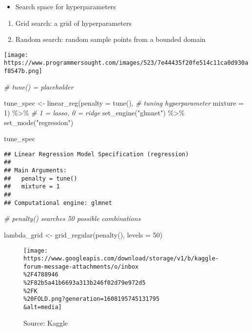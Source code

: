 \documentclass[
]{book}
\newenvironment{Shaded}{\begin{snugshade}}{\end{snugshade}}
\newcommand{\AttributeTok}[1]{\textcolor[rgb]{0.77,0.63,0.00}{#1}}
\newcommand{\CommentTok}[1]{\textcolor[rgb]{0.56,0.35,0.01}{\textit{#1}}}
\newcommand{\DecValTok}[1]{\textcolor[rgb]{0.00,0.00,0.81}{#1}}
\newcommand{\FunctionTok}[1]{\textcolor[rgb]{0.00,0.00,0.00}{#1}}
\newcommand{\NormalTok}[1]{#1}
\newcommand{\OtherTok}[1]{\textcolor[rgb]{0.56,0.35,0.01}{#1}}
\newcommand{\SpecialCharTok}[1]{\textcolor[rgb]{0.00,0.00,0.00}{#1}}
\newcommand{\StringTok}[1]{\textcolor[rgb]{0.31,0.60,0.02}{#1}}
\providecommand{\tightlist}{%
  \setlength{\itemsep}{0pt}\setlength{\parskip}{0pt}}
\begin{document}
\begin{itemize}
\tightlist
\item
  Search space for hyperparameters
\end{itemize}

\begin{enumerate}
\def\labelenumi{\arabic{enumi}.}
\item
  Grid search: a grid of hyperparameters
\item
  Random search: random sample points from a bounded domain
\end{enumerate}

\texttt{[image: https://www.programmersought.com/images/523/7e44435f20fe514c11ca0d930af8547b.png]}

\begin{Shaded}
\begin{Highlighting}[]
\CommentTok{\# tune() = placeholder }

\NormalTok{tune\_spec }\OtherTok{\textless{}{-}} \FunctionTok{linear\_reg}\NormalTok{(}\AttributeTok{penalty =} \FunctionTok{tune}\NormalTok{(), }\CommentTok{\# tuning hyperparameter }
                        \AttributeTok{mixture =} \DecValTok{1}\NormalTok{) }\SpecialCharTok{\%\textgreater{}\%} \CommentTok{\# 1 = lasso, 0 = ridge }
  \FunctionTok{set\_engine}\NormalTok{(}\StringTok{"glmnet"}\NormalTok{) }\SpecialCharTok{\%\textgreater{}\%}
  \FunctionTok{set\_mode}\NormalTok{(}\StringTok{"regression"}\NormalTok{) }

\NormalTok{tune\_spec}
\end{Highlighting}
\end{Shaded}

\begin{verbatim}
## Linear Regression Model Specification (regression)
## 
## Main Arguments:
##   penalty = tune()
##   mixture = 1
## 
## Computational engine: glmnet
\end{verbatim}

\begin{Shaded}
\begin{Highlighting}[]
\CommentTok{\# penalty() searches 50 possible combinations }

\NormalTok{lambda\_grid }\OtherTok{\textless{}{-}} \FunctionTok{grid\_regular}\NormalTok{(}\FunctionTok{penalty}\NormalTok{(), }\AttributeTok{levels =} \DecValTok{50}\NormalTok{)}
\end{Highlighting}
\end{Shaded}

\begin{figure}
\centering
\texttt{[image: https://www.googleapis.com/download/storage/v1/b/kaggle-forum-message-attachments/o/inbox\\\%2F4788946\\\%2F82b5a41b6693a313b246f02d79e972d5\\\%2FK\\\%20FOLD.png?generation=1608195745131795\\\&alt=media]}
\caption{Source: Kaggle}
\end{figure}
\end{document}
